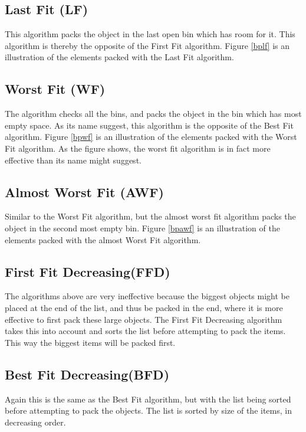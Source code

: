 \subsection{Last Fit (LF)}
This algorithm packs the object in the last open bin which has room for it. This algorithm is thereby the opposite of the First Fit algorithm. Figure \ref{bplf} is an illustration of the elements packed with the Last Fit algorithm.

\subsection{Worst Fit (WF)}
The algorithm checks all the bins, and packs the object in the bin which has most empty space. As its name suggest, this algorithm is the opposite of the Best Fit algorithm. Figure \ref{bpwf} is an illustration of the elements packed with the Worst Fit algorithm. As the figure shows, the worst fit algorithm is in fact more effective than its name might suggest. 

\subsection{Almost Worst Fit (AWF)}
Similar to the Worst Fit algorithm, but the almost worst fit algorithm packs the object in the second most empty bin.  Figure \ref{bpawf} is an illustration of the elements packed with the almost Worst Fit algorithm.

\subsection{First Fit Decreasing(FFD)}
The algorithms above are very ineffective because the biggest objects might be placed at the end of the list, and thus be packed in the end, where it is more effective to first pack these large objects.
The First Fit Decreasing algorithm takes this into account and sorts the list before attempting to pack the items. This way the biggest items will be packed first.

\subsection{Best Fit Decreasing(BFD)}
Again this is the same as the Best Fit algorithm, but with the list being sorted before attempting to pack the objects. The list is sorted by size of the items, in decreasing order. 

